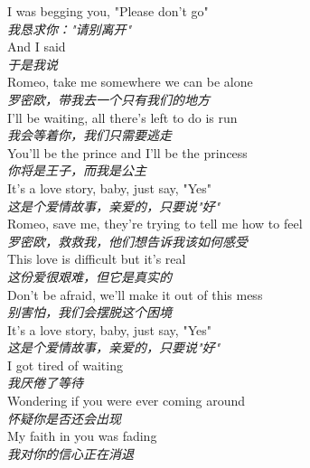 \begin{spacing}{1.5}
\begin{flushleft}
I was begging you, "Please don't go"\\
\textit{我恳求你："请别离开"}\\[0.5em]

And I said\\
\textit{于是我说}\\[0.5em]

Romeo, take me somewhere we can be alone\\
\textit{罗密欧，带我去一个只有我们的地方}\\[0.5em]

I'll be waiting, all there's left to do is run\\
\textit{我会等着你，我们只需要逃走}\\[0.5em]

You'll be the prince and I'll be the princess\\
\textit{你将是王子，而我是公主}\\[0.5em]

It's a love story, baby, just say, "Yes"\\
\textit{这是个爱情故事，亲爱的，只要说"好"}\\[0.5em]

Romeo, save me, they're trying to tell me how to feel\\
\textit{罗密欧，救救我，他们想告诉我该如何感受}\\[0.5em]

This love is difficult but it's real\\
\textit{这份爱很艰难，但它是真实的}\\[0.5em]

Don't be afraid, we'll make it out of this mess\\
\textit{别害怕，我们会摆脱这个困境}\\[0.5em]

It's a love story, baby, just say, "Yes"\\
\textit{这是个爱情故事，亲爱的，只要说"好"}\\[0.5em]

I got tired of waiting\\
\textit{我厌倦了等待}\\[0.5em]

Wondering if you were ever coming around\\
\textit{怀疑你是否还会出现}\\[0.5em]

My faith in you was fading\\
\textit{我对你的信心正在消退}\\[0.5em]


\end{flushleft}
\end{spacing}
